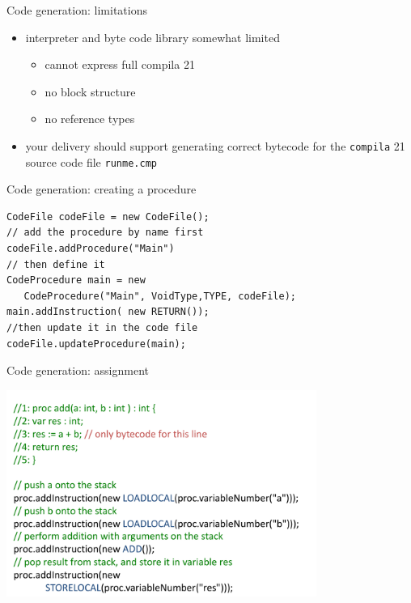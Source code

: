 \documentclass{beamer}
\begin{document}
\begin{frame}[label={sec:orgdd8fb3f},fragile]{Code generation: limitations}
 \begin{itemize}
\item interpreter and byte code library somewhat \alert{limited}
\begin{itemize}
\item cannot express full compila 21
\item no block structure
\item no reference types
\end{itemize}
\end{itemize}


\begin{itemize}
\item your delivery should support generating correct bytecode
for the \texttt{compila} 21 source code file \texttt{runme.cmp}
\end{itemize}
\end{frame}



\begin{frame}[label={sec:org9889de2},fragile,plain]{Code generation: creating a procedure}
 \lstset{language=java,label= ,caption= ,captionpos=b,numbers=none}
\begin{lstlisting}
CodeFile codeFile = new CodeFile();
// add the procedure by name first
codeFile.addProcedure("Main")
// then define it
CodeProcedure main = new 
   CodeProcedure("Main", VoidType,TYPE, codeFile);
main.addInstruction( new RETURN());
//then update it in the code file
codeFile.updateProcedure(main);
\end{lstlisting}
\end{frame}

\begin{frame}[label={sec:org0a23fb0}]{Code generation: assignment}
\begin{center}
 \includegraphics[width=0.76\textwidth]{figures/snaps/codegen-assignment}
\end{center}
\end{frame}
\end{document}
